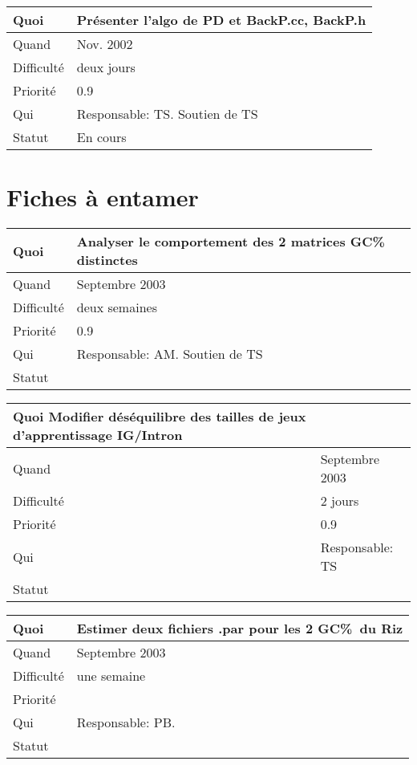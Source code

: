 \documentclass[a4paper,11pt]{article}
\begin{document}
\begin{longtable}{|l|p{7cm}|}\hline
  Quoi & Pr{\'e}senter l'algo de PD et BackP.cc, BackP.h \\\hline
  Quand  &  Nov. 2002\\\hline
  Difficult\'e & deux jours  \\\hline
  Priorit\'e &  0.9\\\hline
  Qui & Responsable: TS. Soutien de TS\\\hline
  Statut & En cours\\\hline
\end{longtable}


\section{Fiches \`a entamer}

\begin{longtable}{|l|p{7cm}|}\hline
  Quoi & Analyser le comportement des 2 matrices GC\% distinctes\\\hline
  Quand  &  Septembre 2003 \\\hline
  Difficult\'e & deux semaines \\\hline
  Priorit\'e &  0.9\\\hline
  Qui & Responsable: AM. Soutien de TS\\\hline
  Statut & \\\hline
\end{longtable}

\begin{longtable}{|l|p{7cm}|}\hline
  Quoi Modifier d\'es\'equilibre des tailles de jeux d'apprentissage IG/Intron& \\\hline
  Quand  &  Septembre 2003\\\hline
  Difficult\'e & 2 jours \\\hline
  Priorit\'e &  0.9 \\\hline
  Qui & Responsable: TS\\\hline
  Statut & \\\hline
\end{longtable}

\begin{longtable}{|l|p{7cm}|}\hline
  Quoi & Estimer deux fichiers .par pour les 2 GC\%\ du Riz\\\hline
  Quand  &  Septembre 2003\\\hline
  Difficult\'e &  une semaine\\\hline
  Priorit\'e &  \\\hline
  Qui & Responsable: PB.\\\hline
  Statut & \\\hline
\end{longtable}
\end{document}
